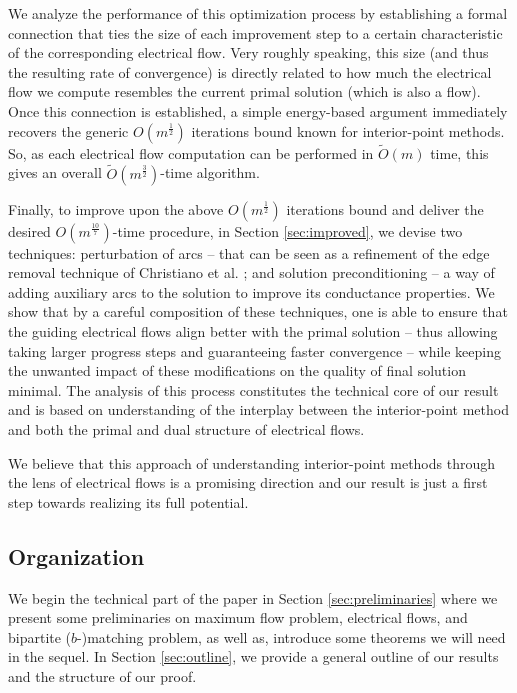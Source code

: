 \documentclass[11pt, letterpaper]{article}
\newcommand{\tO}[1]{\widetilde{O}(#1)}
\newcommand{\bb}{\boldsymbol{\mathit{b}}}
\begin{document}
We analyze the performance of this optimization process by establishing a formal connection that ties the size of each improvement step to a certain characteristic of the corresponding electrical flow. Very roughly speaking, this size (and thus the resulting rate of convergence) is directly related to how much the electrical flow we compute resembles the current primal solution (which is also a flow). Once this connection is established, a simple energy-based argument immediately recovers the generic $O(m^{\frac{1}{2}})$ iterations bound known for interior-point methods. So, as each electrical flow computation can be performed in $\tO{m}$ time, this gives an overall $\tO{m^{\frac{3}{2}}}$-time algorithm.  

Finally, to improve upon the above $O(m^{\frac{1}{2}})$ iterations bound and deliver the desired $O(m^{\frac{10}{7}})$-time procedure, in Section \ref{sec:improved}, we devise two techniques: perturbation of arcs -- that can be seen as a refinement of the edge removal technique of  Christiano et al. \cite{ChristianoKMST11}; and solution preconditioning -- a way of adding auxiliary arcs to the solution to improve its conductance properties. We show that by a careful composition of these techniques, one is able to ensure that the guiding electrical flows align better with the primal solution -- thus allowing taking larger progress steps and guaranteeing faster convergence -- while keeping the unwanted impact of these modifications on the quality of final solution minimal. The analysis of this process constitutes the technical core of our result and is based on understanding of the interplay between the interior-point method and both the primal and dual structure of electrical flows.

We believe that this approach of understanding interior-point methods through the lens of electrical flows is a promising direction and our result is just a first step towards realizing its full potential. 




\subsection{Organization}

We begin the technical part of the paper in Section \ref{sec:preliminaries} where we present some preliminaries on maximum flow problem, electrical flows, and bipartite ($\bb$-)matching problem, as well as, introduce some theorems we will need in the sequel. In Section \ref{sec:outline}, we provide a general outline of our results and the structure of our proof. 
\end{document}
